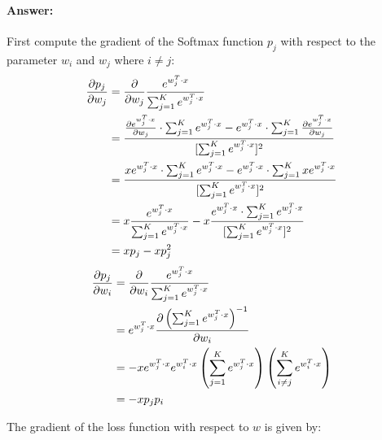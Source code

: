 \documentclass[10pt]{article}
\begin{document}
\paragraph{Answer:} First compute the gradient of the Softmax function $p_j$ with respect to the parameter $w_i$ and $w_j$ where $i\neq j$:
\begin{align*}
  \pdv{p_j}{w_j} &=\pdv{}{w_j}\frac{e^{w_{j}^{T} \cdot x}}{\sum_{j=1}^{K} e^{w_{j}^{T} \cdot x}}\\
  &=\frac{\pdv{e^{w_{j}^{T} \cdot x}}{w_j}\cdot \sum_{j=1}^{K} e^{w_{j}^{T} \cdot x}-e^{w_{j}^{T} \cdot x} \cdot \sum_{j=1}^{K} \pdv{e^{w_{j}^{T} \cdot x}}{w_j}}{[\sum_{j=1}^{K} e^{w_{j}^{T} \cdot x}]^2}\\
  &=\frac{x e^{w_{j}^{T} \cdot x } \cdot \sum_{j=1}^{K} e^{w_{j}^{T} \cdot x}-e^{w_{j}^{T} \cdot x} \cdot \sum_{j=1}^{K} x e^{w_{j}^{T} \cdot x }}{[\sum_{j=1}^{K} e^{w_{j}^{T} \cdot x}]^2}\\
  &=x\frac{e^{w_{j}^{T} \cdot x }}{\sum_{j=1}^{K} e^{w_{j}^{T} \cdot x}}- x \frac{e^{w_{j}^{T} \cdot x} \cdot \sum_{j=1}^{K} e^{w_{j}^{T} \cdot x }}{[\sum_{j=1}^{K} e^{w_{j}^{T} \cdot x}]^2}\\
  &=x p_{j}- x p^2_{j}\\
\end{align*}
\begin{align*}
  \pdv{p_j}{w_i} &=\pdv{}{w_i}\frac{e^{w_{j}^{T} \cdot x}}{\sum_{j=1}^{K} e^{w_{j}^{T} \cdot x}}\\
  &=e^{w_{j}^{T} \cdot x} \pdv{\left(\sum_{j=1}^{K} e^{w_{j}^{T} \cdot x}\right)^{-1}}{w_i}\\
  &=- x e^{w_{j}^{T} \cdot x} e^{w_{i}^{T} \cdot x} \left(\sum_{j=1}^{K} e^{w_{j}^{T} \cdot x}\right)\left(\sum_{i\neq j}^{K} e^{w_{i}^{T} \cdot x}\right)\\
  &=-x p_j p_i
\end{align*}

The gradient of the loss function with respect to $w$ is given by:
\end{document}
